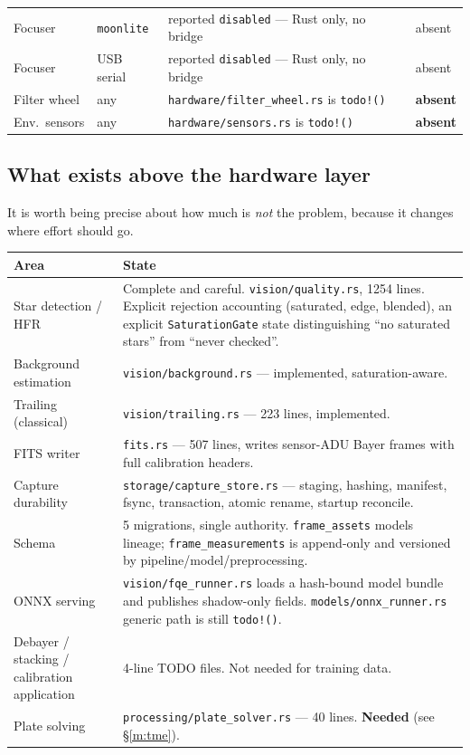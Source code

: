 \documentclass[11pt]{article}
\newcommand{\co}[1]{\texttt{\small #1}}
\begin{document}
\begin{center}
\begin{tabular}{@{}llp{}p{}@{}}
Focuser & \co{moonlite}& reported \co{disabled} --- Rust only, no bridge & absent \\
Focuser & USB serial   & reported \co{disabled} --- Rust only, no bridge & absent \\
\midrule
Filter wheel & any     & \co{hardware/filter\_wheel.rs} is \co{todo!()} & \textbf{absent} \\
Env.\ sensors & any    & \co{hardware/sensors.rs} is \co{todo!()} & \textbf{absent} \\
\bottomrule
\end{tabular}
\end{center}

\subsection{What exists above the hardware layer}

It is worth being precise about how much is \emph{not} the problem, because it
changes where effort should go.

\begin{center}
\small
\begin{tabular}{@{}p{}p{}@{}}
\toprule
\textbf{Area} & \textbf{State} \\
\midrule
Star detection / HFR & Complete and careful. \co{vision/quality.rs}, 1254 lines. Explicit rejection accounting (saturated, edge, blended), an explicit \co{SaturationGate} state distinguishing ``no saturated stars'' from ``never checked''. \\
Background estimation & \co{vision/background.rs} --- implemented, saturation-aware. \\
Trailing (classical) & \co{vision/trailing.rs} --- 223 lines, implemented. \\
FITS writer & \co{fits.rs} --- 507 lines, writes sensor-ADU Bayer frames with full calibration headers. \\
Capture durability & \co{storage/capture\_store.rs} --- staging, hashing, manifest, fsync, transaction, atomic rename, startup reconcile. \\
Schema & 5 migrations, single authority. \co{frame\_assets} models lineage; \co{frame\_measurements} is append-only and versioned by pipeline/model/preprocessing. \\
ONNX serving & \co{vision/fqe\_runner.rs} loads a hash-bound model bundle and publishes shadow-only fields. \co{models/onnx\_runner.rs} generic path is still \co{todo!()}. \\
Debayer / stacking / calibration application & 4-line TODO files. Not needed for training data. \\
Plate solving & \co{processing/plate\_solver.rs} --- 40 lines. \textbf{Needed} (see \S\ref{m:tme}). \\
\bottomrule
\end{tabular}
\end{center}
\end{document}
